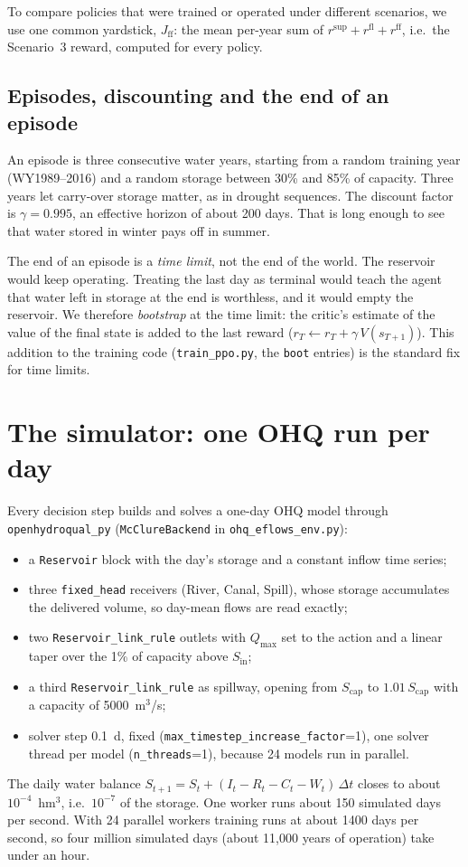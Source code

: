\documentclass[11pt]{article}
\newcommand{\Scap}{S_{\mathrm{cap}}}
\newcommand{\Smin}{S_{\mathrm{in}}}
\newcommand{\code}[1]{\texttt{#1}}
\begin{document}
To compare policies that were trained or operated under different
scenarios, we use one common yardstick, $J_{\mathrm{ff}}$: the mean
per-year sum of $r^{\mathrm{sup}}+r^{\mathrm{fl}}+r^{\mathrm{ff}}$, i.e.\
the Scenario~3 reward, computed for every policy.

\subsection{Episodes, discounting and the end of an episode}
An episode is three consecutive water years, starting from a random
training year (WY1989--2016) and a random storage between 30\% and 85\% of
capacity. Three years let carry-over storage matter, as in drought
sequences. The discount factor is $\gamma=0.995$, an effective horizon of
about 200 days. That is long enough to see that water stored in winter
pays off in summer.

The end of an episode is a \emph{time limit}, not the end of the world.
The reservoir would keep operating. Treating the last day as terminal would
teach the agent that water left in storage at the end is worthless, and it
would empty the reservoir. We therefore \emph{bootstrap} at the time limit:
the critic's estimate of the value of the final state is added to the last
reward ($r_T\leftarrow r_T+\gamma\,V(s_{T+1})$). This addition to the
training code (\code{train\_ppo.py}, the \code{boot} entries) is the standard
fix for time limits.

\section{The simulator: one OHQ run per day}
\label{sec:ohq}
Every decision step builds and solves a one-day OHQ model through
\code{openhydroqual\_py} (\code{McClureBackend} in \code{ohq\_eflows\_env.py}):
\begin{itemize}
\item a \code{Reservoir} block with the day's storage and a constant inflow time series;
\item three \code{fixed\_head} receivers (River, Canal, Spill), whose storage
  accumulates the delivered volume, so day-mean flows are read exactly;
\item two \code{Reservoir\_link\_rule} outlets with $Q_{\max}$ set to the
  action and a linear taper over the 1\% of capacity above $\Smin$;
\item a third \code{Reservoir\_link\_rule} as spillway, opening from $\Scap$
  to $1.01\,\Scap$ with a capacity of 5000~m$^3$/s;
\item solver step 0.1~d, fixed (\code{max\_timestep\_increase\_factor}=1),
  one solver thread per model (\code{n\_threads}=1), because 24 models run
  in parallel.
\end{itemize}
The daily water balance $S_{t+1}=S_t+(I_t-R_t-C_t-W_t)\,\Delta t$ closes to
about $10^{-4}$~hm$^3$, i.e.\ $10^{-7}$ of the storage. One worker runs
about 150 simulated days per second. With 24 parallel workers training
runs at about 1400 days per second, so four million simulated days
(about 11{,}000 years of operation) take under an hour.
\end{document}
